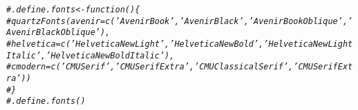 \documentclass[a4paper]{article}\usepackage[]{graphicx}\usepackage[]{color}
\makeatletter
\newcommand{\hlcom}[1]{\textcolor[rgb]{0.678,0.584,0.686}{\textit{#1}}}%
\newenvironment{kframe}{%
 \def\at@end@of@kframe{}%
 \ifinner\ifhmode%
  \def\at@end@of@kframe{\end{minipage}}%
  \begin{minipage}{\columnwidth}%
 \fi\fi%
 \def\FrameCommand##1{\hskip\@totalleftmargin \hskip-\fboxsep
 \colorbox{shadecolor}{##1}\hskip-\fboxsep
     \hskip-\linewidth \hskip-\@totalleftmargin \hskip\columnwidth}%
 \MakeFramed {\advance\hsize-\width
   \@totalleftmargin\z@ \linewidth\hsize
   \@setminipage}}%
 {\par\unskip\endMakeFramed%
 \at@end@of@kframe}
\newenvironment{knitrout}{}{} %
\makeatother
\begin{document}
\begin{knitrout}
\color{fgcolor}\begin{kframe}
\begin{alltt}
\hlcom{# .define.fonts <- function () \{}
\hlcom{#     quartzFonts(avenir =    c('Avenir Book', 'Avenir Black', 'Avenir Book Oblique', 'Avenir Black Oblique'),}
\hlcom{#                 helvetica = c('Helvetica New Light', 'Helvetica New Bold', 'Helvetica New Light Italic', 'Helvetica New Bold Italic'),}
\hlcom{#                 cmodern = c('CMU Serif', 'CMU Serif Extra','CMU Classical Serif','CMU Serif Extra'))}
\hlcom{# \}}
\hlcom{# .define.fonts()}
\end{alltt}
\end{kframe}
\end{knitrout}
\end{document}
